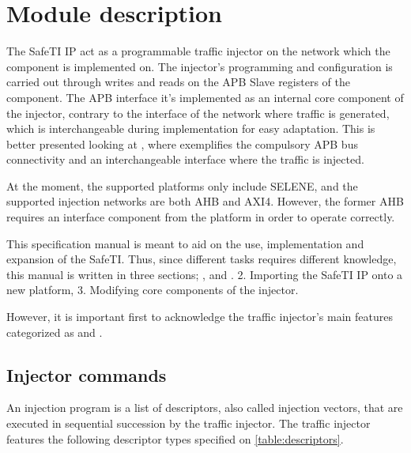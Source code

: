 \newpage
\section{Module description}
\label{module desc}

The SafeTI IP act as a programmable traffic injector on the network which the component is implemented on.
The injector's programming and configuration is carried out through writes and reads on the APB Slave registers of the component.
The APB interface it's implemented as an internal core component of the injector, contrary to the interface of the network where traffic is generated, 
which is interchangeable during implementation for easy adaptation.
This is better presented looking at , where exemplifies the compulsory APB bus connectivity and an interchangeable interface 
where the traffic is injected.

At the moment, the supported platforms only include SELENE, and the supported injection networks are both AHB and AXI4. However, the former AHB requires an 
interface component from the platform in order to operate correctly.

This specification manual is meant to aid on the use, implementation and expansion of the SafeTI.
Thus, since different tasks requires different knowledge, this manual is written in three sections; , 
\fullref{} and \fullref{}. 2. Importing the SafeTI IP onto a new platform, 3. Modifying core components of the injector.

However, it is important first to acknowledge the traffic injector's main features categorized as  and .


\subsection{Injector commands}
\label{module desc-commands}

An injection program is a list of descriptors, also called injection vectors, that are executed in sequential succession by the traffic injector. 
The traffic injector features the following descriptor types specified on \autoref{table:descriptors}.

